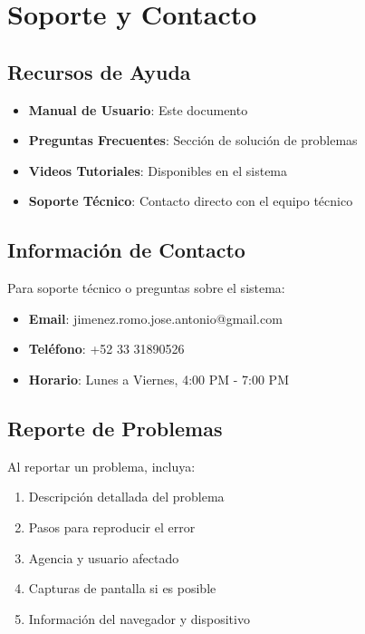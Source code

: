 \documentclass[11pt,a4paper]{article}
\begin{document}
\section{Soporte y Contacto}

\subsection{Recursos de Ayuda}

\begin{itemize}
    \item \textbf{Manual de Usuario}: Este documento
    \item \textbf{Preguntas Frecuentes}: Sección de solución de problemas
    \item \textbf{Videos Tutoriales}: Disponibles en el sistema
    \item \textbf{Soporte Técnico}: Contacto directo con el equipo técnico
\end{itemize}

\subsection{Información de Contacto}

Para soporte técnico o preguntas sobre el sistema:

\begin{itemize}
    \item \textbf{Email}: jimenez.romo.jose.antonio@gmail.com
    \item \textbf{Teléfono}: +52 33 31890526
    \item \textbf{Horario}: Lunes a Viernes, 4:00 PM - 7:00 PM
\end{itemize}

\subsection{Reporte de Problemas}

Al reportar un problema, incluya:

\begin{enumerate}
    \item Descripción detallada del problema
    \item Pasos para reproducir el error
    \item Agencia y usuario afectado
    \item Capturas de pantalla si es posible
    \item Información del navegador y dispositivo
\end{enumerate}
\end{document}
